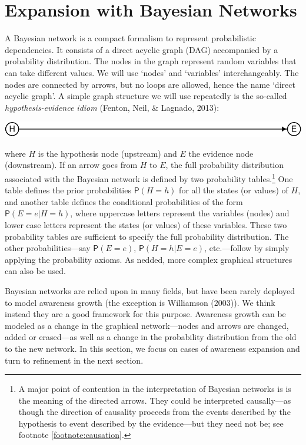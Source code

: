 \documentclass[
  11pt,
  dvipsnames,enabledeprecatedfontcommands]{scrartcl}
\newcommand{\pr}[1]{\ensuremath{\mathsf{P}(#1)}}
\begin{document}
\hypertarget{expansion-with-bayesian-networks}{%
\section{Expansion with Bayesian
Networks}\label{expansion-with-bayesian-networks}}

A Bayesian network is a compact formalism to represent probabilistic
dependencies. It consists of a direct acyclic graph (DAG) accompanied by
a probability distribution. The nodes in the graph represent random
variables that can take different values. We will use `nodes' and
`variables' interchangeably. The nodes are connected by arrows, but no
loops are allowed, hence the name `direct acyclic graph'. A simple graph
structure we will use repeatedly is the so-called
\emph{hypothesis-evidence idiom} (Fenton, Neil, \& Lagnado, 2013):

\begin{center}\includegraphics[width=0.5\linewidth,height=0.5\textheight]{ReplyToSteeleStefansson5_files/figure-latex/heDAG-prel-1} \end{center}

\noindent where \(H\) is the hypothesis node (upstream) and \(E\) the
evidence node (downstream). If an arrow goes from \(H\) to \(E\), the
full probability distribution associated with the Bayesian network is
defined by two probability tables.\footnote{A major point of contention
  in the interpretation of Bayesian networks is is the meaning of the
  directed arrows. They could be interpreted causally---as though the
  direction of causality proceeds from the events described by the
  hypothesis to event described by the evidence---but they need not be;
  see footnote \ref{footnote:causation}.} One table defines the prior
probabilities \(\pr{H=h}\) for all the states (or values) of \(H\), and
another table defines the conditional probabilities of the form
\(\pr{E=e \vert H=h}\), where uppercase letters represent the variables
(nodes) and lower case letters represent the states (or values) of these
variables. These two probability tables are sufficient to specify the
full probability distribution. The other probabilities---say \pr{E=e},
\pr{H=h \vert E=e}, etc.---follow by simply applying the probability
axioms. As nedded, more complex graphical structures can also be used.

Bayesian networks are relied upon in many fields, but have been rarely
deployed to model awareness growth (the exception is Williamson (2003)).
We think instead they are a good framework for this purpose. Awareness
growth can be modeled as a change in the graphical network---nodes and
arrows are changed, added or erased---as well as a change in the
probability distribution from the old to the new network. In this
section, we focus on cases of awareness expansion and turn to refinement
in the next section.
\end{document}
